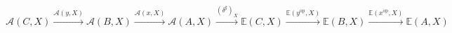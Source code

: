 \documentclass[preview]{standalone}
\begin{document}
\begin{center}
$$\mathscr{A}(C,X) \xrightarrow{\mathscr{A}(y,X)} \mathscr{A}(B,X) \xrightarrow{\mathscr{A}(x,X)} \mathscr{A}(A,X) \xrightarrow{(\delta^\sharp)_X} \mathbb{E}(C,X) \xrightarrow{\mathbb{E}(y^\text{op},X)} \mathbb{E}(B,X) \xrightarrow{\mathbb{E}(x^\text{op},X)} \mathbb{E}(A,X)$$
\end{center}
\end{document}
